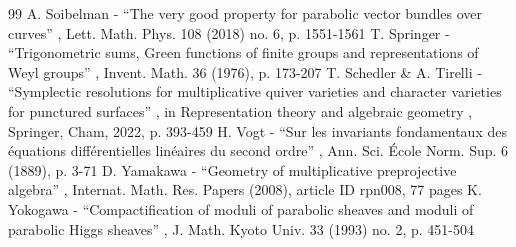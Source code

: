 \documentclass[11pt]{article}
\theoremstyle{definition}
\theoremstyle{plain}
\begin{document}
\begin{thebibliography}{99}
 A. Soibelman - “The very good property for parabolic vector bundles over curves” , Lett. Math. Phys. 108 (2018) no. 6, p. 1551-1561
 T. Springer - “Trigonometric sums, Green functions of finite groups and representations of Weyl groups” , Invent. Math. 36 (1976), p. 173-207
 T. Schedler \& A. Tirelli - “Symplectic resolutions for multiplicative quiver varieties and character varieties for punctured surfaces” , in Representation theory and algebraic geometry , Springer, Cham, 2022, p. 393-459
 H. Vogt - “Sur les invariants fondamentaux des équations différentielles linéaires du second ordre” , Ann. Sci. École Norm. Sup. 6 (1889), p. 3-71
 D. Yamakawa - “Geometry of multiplicative preprojective algebra” , Internat. Math. Res. Papers (2008), article ID rpn008, 77 pages
 K. Yokogawa - “Compactification of moduli of parabolic sheaves and moduli of parabolic Higgs sheaves” , J. Math. Kyoto Univ. 33 (1993) no. 2, p. 451-504
\end{thebibliography}
\end{document}
